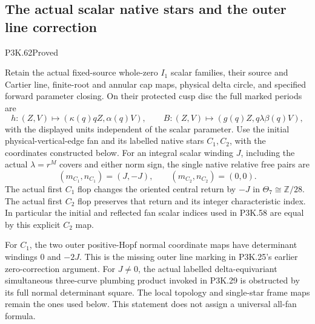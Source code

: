 \subsection{The actual scalar native stars and the outer line correction}
\begin{statement}{P3K.62}{Proved}

Retain the actual fixed-source whole-zero \(I_1\) scalar families,
their source and Cartier line, finite-root and annular cap maps,
physical delta circle, and specified forward parameter closing.
On their protected cusp disc the full marked periods are
\[
 h:(Z,V)\mapsto(\kappa(q)qZ,\alpha(q)V),\qquad
 B:(Z,V)\mapsto(g(q)Z,q\lambda\beta(q)V),
\]
with the displayed units independent of the scalar parameter.
Use the initial physical-vertical-edge fan and its labelled native
stars \(C_1,C_2\), with the coordinates constructed below.
For an integral scalar winding \(J\), including the actual
\(\lambda=r^M\) covers and either norm sign, the single native
relative free pairs are
\[
 (m_{C_1},n_{C_1})=(J,-J),\qquad
 (m_{C_2},n_{C_2})=(0,0).
 \tag{P3K.62.0}
\]
The actual first \(C_1\) flop changes the oriented central return
by \(-J\) in \(\Theta_7\cong\mathbb Z/28\). The actual first
\(C_2\) flop preserves that return and its integer characteristic
index. In particular the initial and reflected fan scalar
indices used in P3K.58 are equal by this explicit \(C_2\) map.

For \(C_1\), the two outer positive-Hopf normal coordinate maps
have determinant windings \(0\) and \(-2J\). This is the missing
outer line marking in P3K.25's earlier zero-correction argument.
For \(J\ne0\), the actual labelled delta-equivariant simultaneous
three-curve plumbing product invoked in P3K.29 is obstructed by
its full normal determinant square. The local topology and
single-star frame maps remain the ones used below. This statement
does not assign a universal all-fan formula.
\end{statement}

